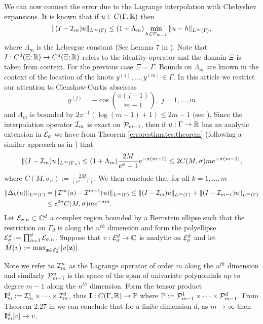 \documentclass[11pt,final]{amsart}       %
\begin{document}
We can now connect the error due to the Lagrange interpolation with
Chebyshev expansions. It is known that if $u \in C(\Gamma,\Bbb{R})$ then
\[
\|(I - {\mathcal I}_{m})u\|_{L^{\infty}(\Gamma)} \leq
(1 + \Lambda_{m})
\min_{h \in {\mathcal P}_{m-1}} \| u - h \|_{L^{\infty}(\Gamma)},
\]
where $\Lambda_{m}$ is the Lebesgue constant (See Lemma 7 in
\cite{babusk_nobile_temp_10}). Note that $I:C^{d}(\Xi;\Bbb{R}) \rightarrow
C^{d}(\Xi;\Bbb{R})$ refers to the identity operator and the domain $\Xi$ is
taken from context. For the previous case $\Xi = \Gamma$.  Bounds on
$\Lambda_{m}$ are known in the context of the location of the knots
$y^{(1)}, \dots, y^{(m)} \in \Gamma$. In this article we restrict our
attention to Clenshaw-Curtis abscissas
\[
y^{(j)} = -\cos \left( \frac{\pi(j-1)}{m - 1} \right),\,\, j =
1,\dots, m
\]
and $\Lambda_m$ is bounded by $2\pi^{-1}(\log{(m-1)} + 1) \leq 2m - 1$
(see \cite{babusk_nobile_temp_10}).  Since the interpolation operator
${\mathcal I}_{m}$ is exact on ${\mathcal P}_{m - 1}$, then if $u:\Gamma \rightarrow
\Bbb{R}$ has an analytic extension in ${\mathcal E}_{\sigma}$ we have from Theorem
\ref{errorestimates:theorem} (following a similar approach as in
\cite{babusk_nobile_temp_10}) that
\[
\begin{split}
\|(I - {\mathcal I}_{m})u\|_{L^{\infty}(\Gamma_n)}
\leq
(1 + \Lambda_{m})
\frac{2M}{e^{\sigma} - 1} e^{-\sigma (m-1)}
\leq 
2 C(M,\sigma) m e^{-\sigma (m-1)},
\end{split}
\]
where $C(M,\sigma_n) := \frac{2M}{(e^{ \sigma} - 1)}$. We then
conclude that for all $k = 1,\dots, m$
\begin{equation}
\begin{split}
\| \Delta_{k}(u) \|_{L^{\infty}(\Gamma)} 
&=
\|
{\mathcal I}^{m}(u) - {\mathcal I}^{m-1}(u)
\|_{L^{\infty}(\Gamma)} 
\leq
\|(I - {\mathcal I}_{m})u\|_{L^{\infty}(\Gamma)}
+
\|(I - {\mathcal I}_{m-1})u\|_{L^{\infty}(\Gamma)} \\
&\leq
e^{2\sigma}C(M,\sigma) m e^{-\sigma m}.
\end{split}
\label{interpolation:eqn1}
\end{equation}
Let ${\mathcal E}_{\sigma,n} \subset \mathbb{C}^{d}$ a complex region bounded by a
Bernstein ellipse such that the restriction on $\Gamma_{d}$ is along
the $n^{th}$ dimension and form the polyellipse ${\mathcal E}^{d}_{\sigma}:=
\prod_{n=1}^{d} {\mathcal E}_{\sigma,n}$.  Suppose that $v:{\mathcal E}^{d}_{\sigma}
\rightarrow \mathbb{C}$ is analytic on ${\mathcal E}^{d}_{\sigma}$ and let
$\tilde{M}(v) := \max_{\mathbf{z} \in {\mathcal E}^{d}_{\sigma}} |v(\mathbf{z})|$.

Note we refer to ${\mathcal I}^{n}_{m}$ as the Lagrange operator of order $m$
along the $n^{th}$ dimension and similarly ${\mathcal P}^{n}_{m-1}$ is the
space of the span of univariate polynomials up to degree $m-1$ along
the $n^{th}$ dimension.  Form the tensor product $\mathbf{I}^{d}_{m} :=
{\mathcal I}^{1}_{m} \times \dots \times {\mathcal I}^{d}_{m}$, thus $\mathbf{I}:C(\Gamma,\Bbb{R})
\rightarrow \mathbb{P}$ where $\mathbb{P} := {\mathcal P}^{1}_{m-1} \times \dots \times
{\mathcal P}^{d}_{m-1}$. From Theorem 2.27 in \cite{Khoromskij2018} we can
conclude that for a finite dimension $d$, as $m \rightarrow \infty$
then $\mathbf{I}^{d}_{m}[v] \rightarrow v$.
\end{document}

